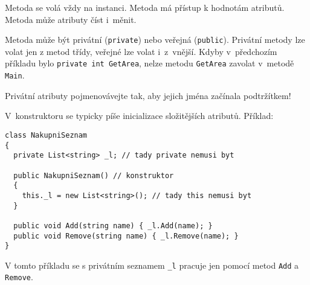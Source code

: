 \documentclass[12pt,a4paper]{article}
\begin{document}
Metoda se volá vždy na instanci. Metoda má přístup k hodnotám atributů. Metoda
může atributy číst i~měnit.

Metoda může být privátní (\texttt{private}) nebo veřejná (\texttt{public}).
Privátní metody lze volat jen z metod třídy, veřejné lze volat i~z~vnější.
Kdyby v~předchozím příkladu bylo \texttt{private int GetArea}, nelze metodu
\texttt{GetArea} zavolat v~metodě \texttt{Main}.

Privátní atributy pojmenovávejte tak, aby jejich jména začínala podtržítkem!

V~konstruktoru se typicky píše inicializace složitějších atributů. Příklad:

\begin{verbatim}
class NakupniSeznam
{
  private List<string> _l; // tady private nemusi byt

  public NakupniSeznam() // konstruktor
  {
    this._l = new List<string>(); // tady this nemusi byt
  }

  public void Add(string name) { _l.Add(name); }
  public void Remove(string name) { _l.Remove(name); }
}
\end{verbatim}

V tomto příkladu se s privátním seznamem \texttt{\_l} pracuje jen pomocí metod
\texttt{Add} a \texttt{Remove}.
\end{document}
